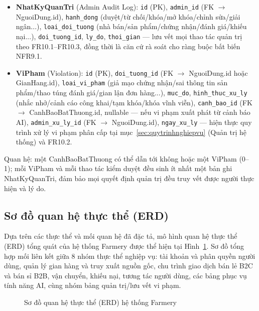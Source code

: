 \begin{itemize}
    \item \textbf{NhatKyQuanTri} (Admin Audit Log): \texttt{id} (PK),
    \texttt{admin\_id} (FK $\to$ NguoiDung.id), \texttt{hanh\_dong}
    (duyệt/từ chối/khóa/mở khóa/chỉnh sửa/giải ngân...),
    \texttt{loai\_doi\_tuong} (nhà bán/sản phẩm/chứng nhận/đánh giá/khiếu
    nại...), \texttt{doi\_tuong\_id}, \texttt{ly\_do}, \texttt{thoi\_gian}
    --- lưu vết mọi thao tác quản trị theo FR10.1--FR10.3, đồng thời là căn
    cứ rà soát cho ràng buộc bất biến NFR9.1.
    \item \textbf{ViPham} (Violation): \texttt{id} (PK),
    \texttt{doi\_tuong\_id} (FK $\to$ NguoiDung.id hoặc GianHang.id),
    \texttt{loai\_vi\_pham} (giả mạo chứng nhận/sai thông tin sản phẩm/thao
    túng đánh giá/gian lận đơn hàng...), \texttt{muc\_do},
    \texttt{hinh\_thuc\_xu\_ly} (nhắc nhở/cảnh cáo công khai/tạm khóa/khóa
    vĩnh viễn), \texttt{canh\_bao\_id} (FK $\to$ CanhBaoBatThuong.id,
    nullable --- nếu vi phạm xuất phát từ cảnh báo AI),
    \texttt{admin\_xu\_ly\_id} (FK $\to$ NguoiDung.id),
    \texttt{ngay\_xu\_ly} --- hiện thực quy trình xử lý vi phạm phân cấp tại
    mục~\ref{sec:quytrinhnghiepvu} (Quản trị hệ thống) và FR10.2.
\end{itemize}
Quan hệ: một CanhBaoBatThuong có thể dẫn tới không hoặc một ViPham (0--1);
mỗi ViPham và mỗi thao tác kiểm duyệt đều sinh ít nhất một bản ghi
NhatKyQuanTri, đảm bảo mọi quyết định quản trị đều truy vết được người thực
hiện và lý do.

\subsection{Sơ đồ quan hệ thực thể (ERD)}
\label{subsec:erd}

Dựa trên các thực thể và mối quan hệ đã đặc tả, mô hình quan hệ thực thể (ERD)
tổng quát của hệ thống Farmery được thể hiện tại Hình~\ref{fig:erd}. Sơ đồ tổng
hợp mối liên kết giữa 8 nhóm thực thể nghiệp vụ: tài khoản và phân quyền người
dùng, quản lý gian hàng và truy xuất nguồn gốc, chu trình giao dịch bán lẻ B2C
và bán sỉ B2B, vận chuyển, khiếu nại, tương tác người dùng, các bảng phục vụ
tính năng AI, cùng nhóm bảng quản trị/lưu vết vi phạm.

\begin{figure}[H]
\centering
\caption{Sơ đồ quan hệ thực thể (ERD) hệ thống Farmery}
\label{fig:erd}
\end{figure}


